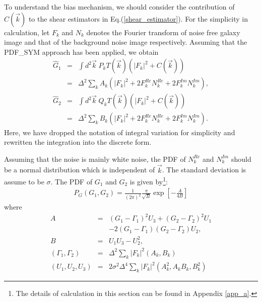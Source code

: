 \documentclass[twocolumn]{aastex62}
\begin{document}
To understand the bias mechanism, we should consider the contribution of $C(\vec{k})$ to the shear estimators in Eq.(\ref{shear_estimator}). For the simplicity in calculation, let $F_k$ and $N_k$ denotes the Fourier transform of noise free galaxy image and that of the background noise image respectively. Assuming that the PDF\_SYM approach has been applied, we obtain
\begin{eqnarray}
\hat{G}_1&=&\int{d}^2\vec{k} \; P_k T(\vec{k})\left(\vert F_k\vert^2 + C(\vec{k})\right) \\ \nonumber
&=&\Delta^2\sum_k A_k \left(\vert F_k\vert^2+2F_k^{Re}N_k^{Re}+2F_k^{Im}N_k^{Im}\right), \\ \nonumber
\hat{G}_2&=&\int{d}^2\vec{k} \; Q_k T(\vec{k})\left(\vert F_k\vert^2 + C(\vec{k})\right)\\ \nonumber
&=&\Delta^2\sum_kB_k\left(\vert F_k\vert^2+2F_k^{Re}N_k^{Re}+2F_k^{Im}N_k^{Im}\right).
\end{eqnarray}
Here, we have dropped the notation of integral variation for simplicity and rewritten the integration into the discrete form. 

Assuming that the noise is mainly white noise, the PDF of $N_k^{Re}$ and $N_k^{Im}$ should be a normal distribution which is independent of $\vec{k}$. The standard deviation is assume to be $\sigma$. The PDF of $G_1$ and $G_2$ is given by\footnote{The details of calculation in this section can be found in Appendix \ref{app_a}.}:
\begin{eqnarray}
P_G\left(G_1,G_2\right)=\frac{1}{(2\pi)^2}\frac{\pi}{\sqrt{B}}\exp\left[-\frac{A}{4B}\right]
\end{eqnarray}
where
\begin{eqnarray}
A &=& \left(G_1-\Gamma_1\right)^2U_3+\left(G_2-\Gamma_2\right)^2U_1 \\ \nonumber
&&-2\left(G_1-\Gamma_1\right)\left(G_2-\Gamma_2\right)U_2,\\ \nonumber
B&=& U_1U_3-U_2^2,\\ \nonumber
\left(\Gamma_1,\Gamma_2\right)&=&\Delta^2\sum_k\vert F_k\vert^2\left(A_k,B_k\right)\\ \nonumber
\left(U_1,U_2,U_3\right)&=&2\sigma^2\Delta^4\sum_k\vert F_k\vert^2\left(A_k^2,A_kB_k,B_k^2\right)
\end{eqnarray}
\end{document}
